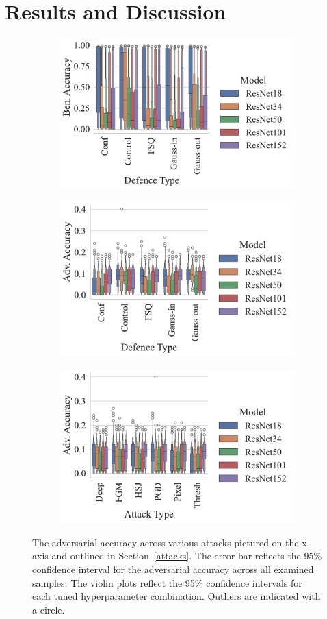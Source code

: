 \section{Results and Discussion}
\label{results}
\begin{figure}[!h]
\begin{subfigure}
    \centering
    \includegraphics[trim={0 5pt 0 10pt},clip,width=.45\textwidth]{plots/ben_accuracy_vs_defence_type.pdf}
\end{subfigure}
\begin{subfigure}
    \centering
    \includegraphics[trim={0 5pt 0 10pt},clip,width=.45\textwidth]{plots/adv_accuracy_vs_defence_type.pdf}
\end{subfigure}
\begin{subfigure}
    \centering
    \includegraphics[trim={0 5pt 0 10pt},clip,width=.45\textwidth]{plots/adv_accuracy_vs_attack_type.pdf}
\end{subfigure}
\caption{The adversarial accuracy across various attacks pictured on the x-axis and outlined in Section~\ref{attacks}. The error bar reflects the 95\% confidence interval for the adversarial accuracy across all examined samples. The violin plots reflect the 95\% confidence intervals for each tuned hyperparameter combination. Outliers are indicated with a circle.}
\label{fig:accuracies}
\end{figure}

